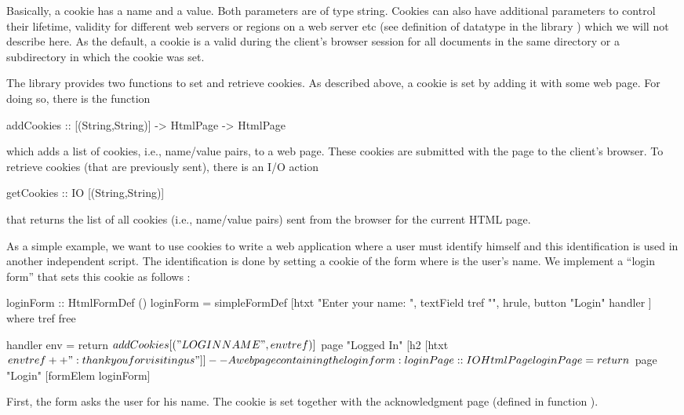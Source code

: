Basically, a cookie has a name and a value.
Both parameters are of type string.
Cookies can also have additional parameters to control their
lifetime, validity for different web servers or regions
on a web server etc (see definition of datatype
 in the library ) which we will not describe
here. As the default, a cookie is a valid during the client's
browser session for all documents in the same directory or
a subdirectory in which the cookie was set.

The library  provides two functions to set
and retrieve cookies.
As described above, a cookie is set by adding it with some
web page. For doing so, there is the function
%
\begin{curry}
addCookies :: [(String,String)] -> HtmlPage -> HtmlPage
\end{curry}
%
which adds a list of cookies, i.e., name/value pairs, to a web page.
These cookies are submitted with the page to the client's browser.
To retrieve cookies (that are previously sent),
there is an I/O action
%
\begin{curry}
getCookies :: IO [(String,String)]
\end{curry}
%
that returns the list of all cookies (i.e., name/value pairs)
sent from the browser for the current HTML page.

As a simple example, we want to use cookies to write a web application
where a user must identify himself and this identification is used
in another independent script. The identification is done
by setting a cookie of the form 
where  is the user's name.
We implement a ``login form'' that sets this cookie as follows
:
%
\begin{curry}
loginForm :: HtmlFormDef ()
loginForm = simpleFormDef
  [htxt "Enter your name: ", textField tref "",
   hrule,
   button "Login" handler
  ]
 where
   tref free

   handler env = return $
     addCookies [("LOGINNAME", env tref)] $
       page "Logged In"
            [h2 [htxt $ env tref ++ ": thank you for visiting us"]]

-- A web page containing the login form:
loginPage :: IO HtmlPage
loginPage = return $ page "Login" [formElem loginForm]
\end{curry}
%
First, the form asks the user for his name.
The cookie is set together with the acknowledgment page
(defined in function ).

